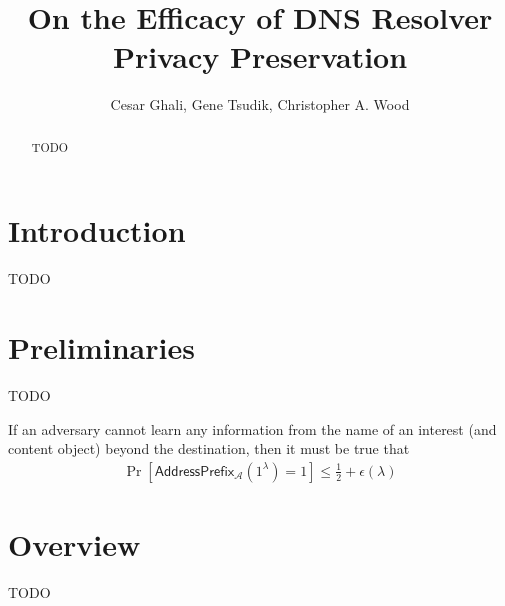 \documentclass{llncs}
\begin{document}
\mainmatter              %
\title{On the Efficacy of DNS Resolver Privacy Preservation}

\author{Cesar Ghali, Gene Tsudik, Christopher A. Wood}


\maketitle

\begin{abstract}
TODO
\end{abstract}

\section{Introduction}
TODO

\section{Preliminaries}
TODO


If an adversary cannot learn any information from the name of an interest (and content object)
beyond the destination, then it must be true that
\begin{align*}
\Pr[\mathsf{AddressPrefix}_{\mathcal{A}}(1^\lambda) = 1]\leq \frac{1}{2} + \epsilon(\lambda)
\end{align*}

\section{Overview}
TODO
\end{document}
